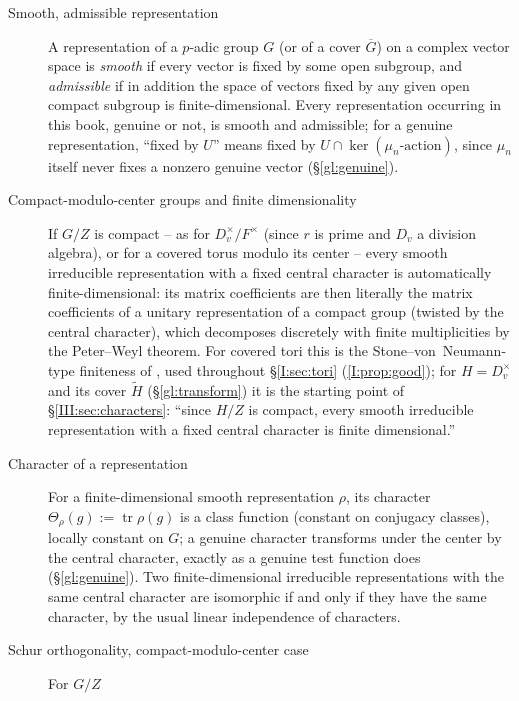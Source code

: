 \begin{description}
\item[Smooth, admissible representation] A representation of a
$p$-adic group $G$ (or of a cover $\overline G$) on a complex vector
space is \emph{smooth} if every vector is fixed by some open
subgroup, and \emph{admissible} if in addition the space of vectors
fixed by any given open compact subgroup is finite-dimensional.
Every representation occurring in this book, genuine or not, is
smooth and admissible; for a genuine representation, ``fixed by
$U$'' means fixed by $U\cap\ker(\mu_n\text{-action})$, since $\mu_n$
itself never fixes a nonzero genuine vector (\S\ref{gl:genuine}).
\item[Compact-modulo-center groups and finite dimensionality] If
$G/Z$ is compact -- as for $D_v^\times/F^\times$ (since $r$ is prime
and $D_v$ a division algebra), or for a covered torus modulo its
center -- every smooth irreducible representation with a fixed
central character is automatically finite-dimensional: its matrix
coefficients are then literally the matrix coefficients of a unitary
representation of a compact group (twisted by the central
character), which decomposes discretely with finite multiplicities
by the Peter--Weyl theorem. For covered tori this is the
Stone--von~Neumann-type finiteness of \cite[\S0.3]{KP84}, used
throughout \S\ref{I:sec:tori} (\cref{I:prop:good}); for $H=D_v^\times$
and its cover $\widetilde H$ (\S\ref{gl:transform}) it is the
starting point of \S\ref{III:sec:characters}: ``since $H/Z$ is
compact, every smooth irreducible representation with a fixed
central character is finite dimensional.''
\item[Character of a representation] For a finite-dimensional smooth
representation $\rho$, its character $\Theta_\rho(g):=\operatorname{tr}\rho(g)$ is
a class function (constant on conjugacy classes), locally constant
on $G$; a genuine character transforms under the center by the
central character, exactly as a genuine test function does
(\S\ref{gl:genuine}). Two finite-dimensional irreducible
representations with the same central character are isomorphic if
and only if they have the same character, by the usual linear
independence of characters.
\item[Schur orthogonality, compact-modulo-center case] For $G/Z$

\end{description}
